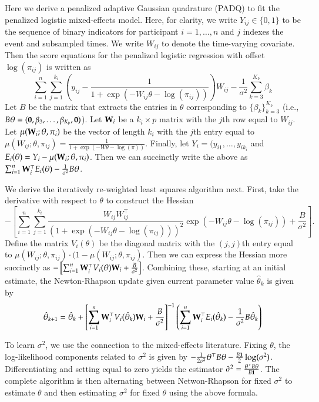 \documentclass[11pt]{amsart}
\def\W{{\bf W}}
\begin{document}
Here we derive a penalized adaptive Gaussian quadrature (PADQ) to fit the   penalized logistic mixed-effects model.  Here, for clarity, we write $Y_{ij} \in \{ 0, 1 \}$ to be the sequence of binary indicators for participant $i = 1,\ldots,n$ and $j$ indexes the event and subsampled times.  We write $W_{ij}$ to denote the time-varying covariate.  Then the score equations for the penalized logistic regression with offset $\log(\pi_{ij})$ is written as
$$
\sum_{i=1}^n \sum_{j=1}^{k_i} \left( y_{ij} - \frac{1}{1+\exp (- W_{ij} \theta - \log (\pi_{ij}) )} \right) W_{ij} - \frac{1}{\sigma^2} \sum_{k=3}^{K_b} \beta_k
$$
Let $B$ be the matrix that extracts the entries in $\theta$ corresponding to $\{ \beta_k\}_{k=3}^{K_b}$ (i.e., $B \theta = ({\bf 0}, \beta_3, \ldots, \beta_{K_b},{\bf 0})$).  Let $\W_i$ be a $k_i \times p$ matrix with the $j$th row equal to $W_{ij}$. Let $\mu(\W_i; \theta, \pi_i)$ be the vector of length $k_i$ with the $j$th entry equal to $\mu(W_{ij}; \theta, \pi_{ij}) = \frac{1}{1+\exp(-W \theta - \log(\pi))}$.  Finally, let $Y_i = (y_{i1},\ldots, y_{i k_i}$ and $E_i (\theta) = Y_i - \mu(\W_i; \theta, \pi_i)$. Then we can succinctly write the above as $\sum_{i=1}^n \W_i^\top E_i (\theta)- \frac{1}{\sigma^2} B \theta$.

We derive the iteratively re-weighted least squares algorithm next. First, take the derivative with respect to $\theta$ to construct the Hessian
$$
- \left[ \sum_{i=1}^n \sum_{j=1}^{k_i} \frac{W_{ij} W_{ij}^\top}{(1+\exp (- W_{ij} \theta - \log (\pi_{ij}) ))^2} \exp(-W_{ij} \theta - \log (\pi_{ij})) + \frac{B}{\sigma^2} \right].
$$
Define the matrix $V_i (\theta)$ be the diagonal matrix with the $(j,j)$th entry equal to $\mu(W_{ij}; \theta, \pi_{ij}) \cdot (1-\mu(W_{ij}; \theta, \pi_{ij})$. Then we can express the Hessian more succinctly as $- \left[ \sum_{i=1}^n \W_i^\top V_i (\theta) \W_i + \frac{B}{\sigma^2} \right]$.  Combining these, starting at an initial estimate, the Newton-Rhapson update given current parameter value $\hat \theta_k$ is given by
$$
\hat \theta_{k+1} = \hat \theta_{k} + \left[ \sum_{i=1}^n \W_i^\top V_i (\hat \theta_k) \W_i + \frac{B}{\sigma^2} \right]^{-1} \left(\sum_{i=1}^n \W_i^\top E_i (\hat \theta_k) - \frac{1}{\sigma^2} B \hat \theta_k \right)
$$

To learn $\sigma^2$, we use the connection to the mixed-effects literature.
Fixing $\theta$, the log-likelihood components related to $\sigma^2$ is given by $-\frac{1}{2\sigma^2} \theta^\top B \theta - \frac{B {\bf 1}}{2} \log (\sigma^2)$.  Differentiating and setting equal to zero yields the estimator
$\hat \sigma^2 = \frac{\theta^\top B \theta}{B {\bf 1}}$.  The complete algorithm is then alternating between Netwon-Rhapson for fixed $\sigma^2$ to estimate $\theta$ and then estimating $\sigma^2$ for fixed $\theta$ using the above formula.
\end{document}
